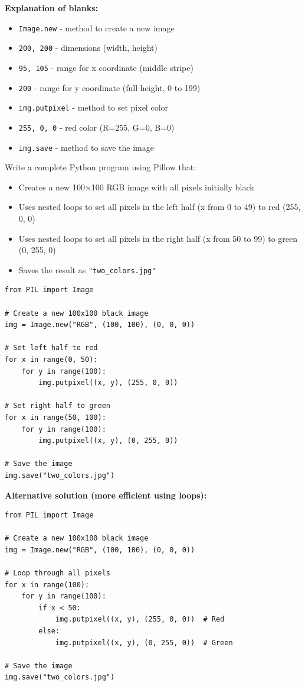 \documentclass{csexam}
\begin{document}
\begin{questions}
\begin{solution}
\textbf{Explanation of blanks:}
\begin{itemize}
    \item \texttt{Image.new} - method to create a new image
    \item \texttt{200, 200} - dimensions (width, height)
    \item \texttt{95, 105} - range for x coordinate (middle stripe)
    \item \texttt{200} - range for y coordinate (full height, 0 to 199)
    \item \texttt{img.putpixel} - method to set pixel color
    \item \texttt{255, 0, 0} - red color (R=255, G=0, B=0)
    \item \texttt{img.save} - method to save the image
\end{itemize}
\end{solution}

\question[12] Write a complete Python program using Pillow that:
\begin{itemize}
    \item Creates a new 100×100 RGB image with all pixels initially black
    \item Uses nested loops to set all pixels in the left half (x from 0 to 49) to red (255, 0, 0)
    \item Uses nested loops to set all pixels in the right half (x from 50 to 99) to green (0, 255, 0)
    \item Saves the result as \texttt{"two\_colors.jpg"}
\end{itemize}

\begin{solution}
\begin{lstlisting}
from PIL import Image

# Create a new 100x100 black image
img = Image.new("RGB", (100, 100), (0, 0, 0))

# Set left half to red
for x in range(0, 50):
    for y in range(100):
        img.putpixel((x, y), (255, 0, 0))

# Set right half to green
for x in range(50, 100):
    for y in range(100):
        img.putpixel((x, y), (0, 255, 0))

# Save the image
img.save("two_colors.jpg")
\end{lstlisting}

\textbf{Alternative solution (more efficient using loops):}
\begin{lstlisting}
from PIL import Image

# Create a new 100x100 black image
img = Image.new("RGB", (100, 100), (0, 0, 0))

# Loop through all pixels
for x in range(100):
    for y in range(100):
        if x < 50:
            img.putpixel((x, y), (255, 0, 0))  # Red
        else:
            img.putpixel((x, y), (0, 255, 0))  # Green

# Save the image
img.save("two_colors.jpg")
\end{lstlisting}
\end{solution}

\end{questions}
\end{document}
